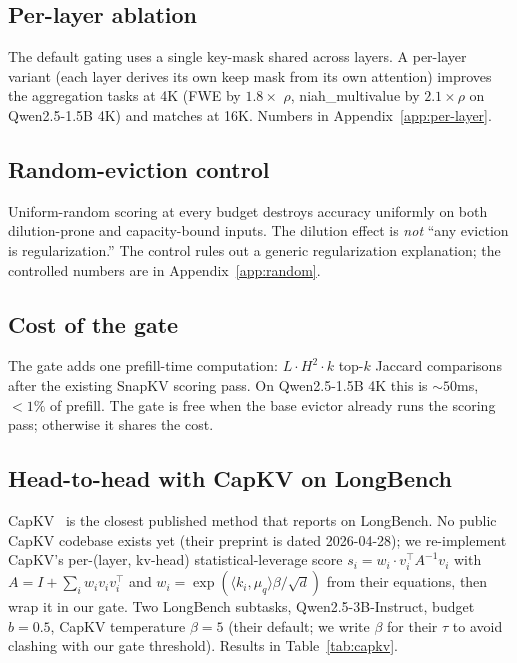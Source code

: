 \documentclass{article} %
\begin{document}
\subsection{Per-layer ablation}

The default gating uses a single key-mask shared across layers. A
per-layer variant (each layer derives its own keep mask from its own
attention) improves the aggregation tasks at 4K (FWE by $1.8 \times$
$\rho$, niah\_multivalue by $2.1 \times \rho$ on Qwen2.5-1.5B 4K) and
matches at 16K. Numbers in Appendix~\ref{app:per-layer}.

\subsection{Random-eviction control}

Uniform-random scoring at every budget destroys accuracy uniformly on
both dilution-prone and capacity-bound inputs. The dilution effect is
\emph{not} ``any eviction is regularization.'' The control rules out a
generic regularization explanation; the controlled numbers are in
Appendix~\ref{app:random}.

\subsection{Cost of the gate}

The gate adds one prefill-time computation: $L \cdot H^2 \cdot k$
top-$k$ Jaccard comparisons after the existing SnapKV scoring pass. On
Qwen2.5-1.5B 4K this is $\sim 50$ms, $< 1\%$ of prefill. The gate is
free when the base evictor already runs the scoring pass; otherwise it
shares the cost.

\subsection{Head-to-head with CapKV on LongBench}
\label{subsec:capkv-longbench}

CapKV~\citep{arxiv260425975} is the closest published method that
reports on LongBench. No public CapKV codebase exists yet (their
preprint is dated 2026-04-28); we re-implement CapKV's per-(layer, kv-head)
statistical-leverage score $s_i = w_i \cdot v_i^\top A^{-1} v_i$ with
$A = I + \sum_i w_i v_i v_i^\top$ and $w_i = \exp(\langle k_i,
\mu_q\rangle \beta / \sqrt d)$ from their equations,
then wrap it in our gate. Two
LongBench subtasks, Qwen2.5-3B-Instruct, budget $b = 0.5$, CapKV
temperature $\beta = 5$ (their default; we write $\beta$ for their
$\tau$ to avoid clashing with our gate threshold). Results in
Table~\ref{tab:capkv}.
\end{document}

